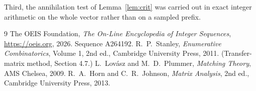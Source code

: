 \documentclass[11pt,a4paper]{article}
\theoremstyle{plain}
\theoremstyle{definition}
\begin{document}
Third, the annihilation test of Lemma~\ref{lem:crit} was carried out in exact integer
arithmetic on the whole vector rather than on a sampled prefix.

\begin{thebibliography}{9}
 The OEIS Foundation, \emph{The On-Line Encyclopedia of Integer
Sequences}, \url{https://oeis.org}, 2026. Sequence A264192.
 R.~P.~Stanley, \emph{Enumerative Combinatorics}, Volume 1, 2nd ed.,
Cambridge University Press, 2011. (Transfer-matrix method, Section 4.7.)
 L.~Lov\'asz and M.~D.~Plummer, \emph{Matching Theory}, AMS Chelsea, 2009.
 R.~A.~Horn and C.~R.~Johnson, \emph{Matrix Analysis}, 2nd ed., Cambridge
University Press, 2013.
\end{thebibliography}
\end{document}
